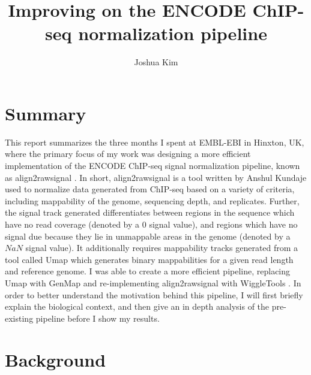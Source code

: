 \documentclass[a4paper]{article}
\title{Improving on the ENCODE ChIP-seq normalization pipeline}
\author{Joshua Kim}
\begin{document}
  \maketitle
  \newpage
  \tableofcontents
  \newpage
  \section{Summary}
  This report summarizes the three months I spent at EMBL-EBI in Hinxton, UK, where the primary focus of my work was
  designing a more efficient implementation of the ENCODE ChIP-seq signal normalization pipeline, known as
  align2rawsignal \cite{hoffman_integrative_2013}. In short, align2rawsignal is a tool written by Anshul Kundaje used to
  normalize data generated from ChIP-seq based on a variety of criteria, including mappability of the genome, sequencing depth,
  and replicates. Further, the signal track generated differentiates between regions in the sequence which have no
  read coverage (denoted by a $0$ signal value), and regions which have no signal due because they lie in unmappable areas
  in the genome (denoted by a $NaN$ signal value). It additionally requires mappability tracks generated from a tool
  called Umap \cite{karimzadeh_umap_2018} which generates binary mappabilities for a given read length and reference genome. I was able to
  create a more efficient pipeline, replacing Umap with GenMap \cite{pockrandt_genmap:_2019} and re-implementing align2rawsignal with
  WiggleTools \cite{zerbino_wiggletools:_2014}. In order to better understand the motivation behind this pipeline, I will first briefly explain the
  biological context, and then give an in depth analysis of the pre-existing pipeline before I show my results.

  \section{Background}
\end{document}
